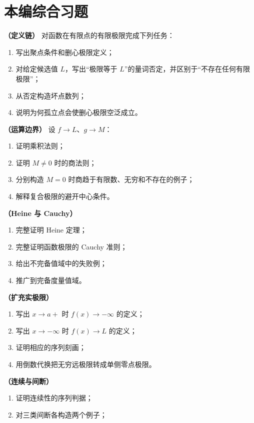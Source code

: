 \section*{本编综合习题}

\begin{enumerate}[label=\textbf{综.\arabic*.}]
  \textbf{（定义链）} 对函数在有限点的有限极限完成下列任务：
 \begin{enumerate}
  \item 写出聚点条件和删心极限定义；
  \item 对给定候选值 \(L\)，写出“极限等于 \(L\)”的量词否定，并区别于“不存在任何有限极限”；
  \item 从否定构造坏点数列；
  \item 说明为何孤立点会使删心极限空泛成立。
 \end{enumerate}
  \textbf{（运算边界）} 设 \(f\to L\)、\(g\to M\)：
 \begin{enumerate}
  \item 证明乘积法则；
  \item 证明 \(M\ne0\) 时的商法则；
  \item 分别构造 \(M=0\) 时商趋于有限数、无穷和不存在的例子；
  \item 解释复合极限的避开中心条件。
 \end{enumerate}
  \textbf{（Heine 与 Cauchy）}
 \begin{enumerate}
  \item 完整证明 Heine 定理；
  \item 完整证明函数极限的 Cauchy 准则；
  \item 给出不完备值域中的失败例；
  \item 推广到完备度量值域。
 \end{enumerate}
  \textbf{（扩充实极限）}
 \begin{enumerate}
  \item 写出 \(x\to a+\) 时 \(f(x)\to-\infty\) 的定义；
  \item 写出 \(x\to-\infty\) 时 \(f(x)\to L\) 的定义；
  \item 证明相应的序列刻画；
  \item 用倒数代换把无穷远极限转成单侧零点极限。
 \end{enumerate}
  \textbf{（连续与间断）}
 \begin{enumerate}
  \item 证明连续性的序列判据；
  \item 对三类间断各构造两个例子；

\end{enumerate}
\end{enumerate}

